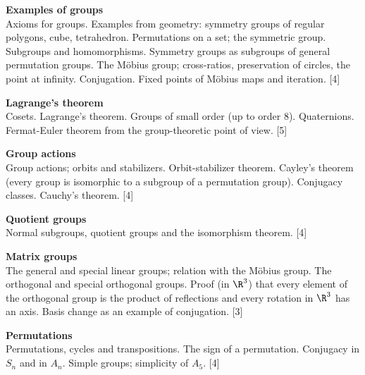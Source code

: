 \documentclass[a4paper]{article}
\begin{document}
\maketitle
{\small
  \noindent\textbf{Examples of groups}\\
  Axioms for groups. Examples from geometry: symmetry groups of regular polygons, cube, tetrahedron. Permutations on a set; the symmetric group. Subgroups and homomorphisms. Symmetry groups as subgroups of general permutation groups. The M\"obius group; cross-ratios, preservation of circles, the point at infinity. Conjugation. Fixed points of M\"obius maps and iteration.\hspace*{\fill} [4]

  \vspace{10pt}
  \noindent\textbf{Lagrange’s theorem}\\
  Cosets. Lagrange’s theorem. Groups of small order (up to order 8). Quaternions. Fermat-Euler theorem from the group-theoretic point of view.\hspace*{\fill} [5]

  \vspace{10pt}
  \noindent\textbf{Group actions}\\
  Group actions; orbits and stabilizers. Orbit-stabilizer theorem. Cayley's theorem (every group is isomorphic to a subgroup of a permutation group). Conjugacy classes. Cauchy's theorem.\hspace*{\fill} [4]

  \vspace{10pt}
  \noindent\textbf{Quotient groups}\\
  Normal subgroups, quotient groups and the isomorphism theorem.\hspace*{\fill} [4]

  \vspace{10pt}
  \noindent
  \textbf{Matrix groups}\\
  The general and special linear groups; relation with the M\"obius group. The orthogonal and special orthogonal groups. Proof (in $\R^3$) that every element of the orthogonal group is the product of reflections and every rotation in $\R^3$ has an axis. Basis change as an example of conjugation.\hspace*{\fill} [3]

  \vspace{10pt}
  \noindent\textbf{Permutations}\\
  Permutations, cycles and transpositions. The sign of a permutation. Conjugacy in $S_n$ and in $A_n$. Simple groups; simplicity of $A_5$.\hspace*{\fill} [4]}
\tableofcontents
\newpage
\end{document}
